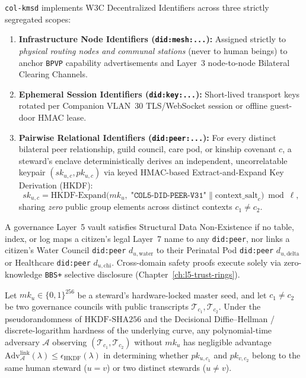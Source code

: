 \texttt{col-kmsd} implements W3C Decentralized Identifiers \parencite{w3c2022did} across three
strictly segregated scopes:
\begin{enumerate}
\item \textbf{Infrastructure Node Identifiers (\texttt{did:mesh:...}):} Assigned strictly to
        \textit{physical routing nodes and communal stations} (never to human beings) to anchor
        \texttt{BPVP} capability advertisements and Layer~3 node-to-node Bilateral Clearing
        Channels.
\item \textbf{Ephemeral Session Identifiers (\texttt{did:key:...}):} Short-lived transport keys
        rotated per Companion VLAN~30 TLS/WebSocket session or offline guest-door HMAC lease.
\item \textbf{Pairwise Relational Identifiers (\texttt{did:peer:...}):} For every distinct
        bilateral peer relationship, guild council, care pod, or kinship covenant $c$, a
        steward's enclave deterministically derives an independent, uncorrelatable keypair
        $(sk_{u,c}, pk_{u,c})$ via keyed HMAC-based Extract-and-Expand Key Derivation (HKDF):
        \[
            sk_{u,c} = \mathrm{HKDF\text{-}Expand}\!\big(mk_u,\; \texttt{"COL5-DID-PEER-V31"} \parallel \mathrm{context\_salt}_c\big) \bmod \ell,
        \]
        sharing \textit{zero} public group elements across distinct contexts $c_1 \neq c_2$.
\end{enumerate}

\begin{definition}
\label{def:ch2-structural-nonexistence}
A governance Layer~5 vault satisfies Structural Data Non-Existence if no table, index, or log
maps a citizen's legal Layer~7 name to any \texttt{did:peer}, nor links a citizen's Water
Council \texttt{did:peer} $d_{u,\mathrm{water}}$ to their Perinatal Pod \texttt{did:peer}
$d_{u,\mathrm{delta}}$ or Healthcare \texttt{did:peer} $d_{u,\mathrm{chi}}$. Cross-domain
safety proofs execute solely via zero-knowledge \texttt{BBS+} selective disclosure
(Chapter~\ref{ch:l5-trust-rings}).
\end{definition}

\begin{theorem}
\label{thm:ch2-pairwise-unlinkability}
Let $mk_u \in \{0,1\}^{256}$ be a steward's hardware-locked master seed, and let $c_1 \neq c_2$
be two governance councils with public transcripts $\mathcal{T}_{c_1}, \mathcal{T}_{c_2}$. Under
the pseudorandomness of $\mathrm{HKDF\text{-}SHA256}$ and the Decisional Diffie--Hellman /
discrete-logarithm hardness of the underlying curve, any polynomial-time adversary $\mathcal{A}$
observing $(\mathcal{T}_{c_1}, \mathcal{T}_{c_2})$ without $mk_u$ has negligible advantage
$\mathrm{Adv}^{\mathrm{link}}_{\mathcal{A}}(\lambda) \le \epsilon_{\mathrm{HKDF}}(\lambda)$ in
determining whether $pk_{u,c_1}$ and $pk_{v,c_2}$ belong to the same human steward ($u = v$) or
two distinct stewards ($u \neq v$).
\end{theorem}

